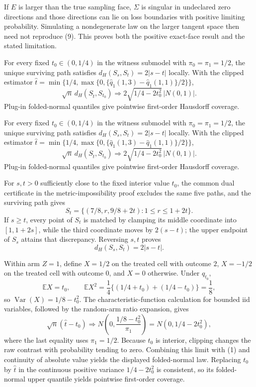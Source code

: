 If \(E\) is larger than the true sampling face, \(\Sigma\) is singular in undeclared zero directions and those directions can lie on loss boundaries with positive limiting probability.  Simulating a nondegenerate law on the larger tangent space then need not reproduce (9).  This proves both the positive exact-face result and the stated limitation.

For every fixed \(t_0\in(0,1/4)\) in the witness submodel with \(\pi_0=\pi_1=1/2\), the unique surviving path satisfies \(d_H(S_s,S_t)=2|s-t|\) locally.  With the clipped estimator \(\widehat t=\min\{1/4,\max\{0,\{\widehat q_1(1,3)-\widehat q_1(1,1)\}/2\}\}\),
\[
\sqrt n\,d_H(S_{\widehat t},S_{t_0})\Rightarrow2\sqrt{1/4-2t_0^2}\,|N(0,1)|.
\]
Plug-in folded-normal quantiles give pointwise first-order Hausdorff coverage.

For every fixed \(t_0\in(0,1/4)\) in the witness submodel with \(\pi_0=\pi_1=1/2\), the unique surviving path satisfies \(d_H(S_s,S_t)=2|s-t|\) locally.  With the clipped estimator \(\widehat t=\min\{1/4,\max\{0,\{\widehat q_1(1,3)-\widehat q_1(1,1)\}/2\}\}\),
\[
\sqrt n\,d_H(S_{\widehat t},S_{t_0})\Rightarrow2\sqrt{1/4-2t_0^2}\,|N(0,1)|.
\]
Plug-in folded-normal quantiles give pointwise first-order Hausdorff coverage.

For \(s,t>0\) sufficiently close to the fixed interior value \(t_0\), the common dual certificate in the metric-impossibility proof excludes the same five paths, and the surviving path gives
\[
S_t=\{(7/8,r,9/8+2t):1\le r\le1+2t\}.
\]
If \(s\ge t\), every point of \(S_t\) is matched by clamping its middle coordinate into \([1,1+2s]\), while the third coordinate moves by \(2(s-t)\); the upper endpoint of \(S_s\) attains that discrepancy.  Reversing \(s,t\) proves
\[
d_H(S_s,S_t)=2|s-t|.
\tag{1}
\]

Within arm \(Z=1\), define \(X=1/2\) on the treated cell with outcome \(2\), \(X=-1/2\) on the treated cell with outcome \(0\), and \(X=0\) otherwise.  Under \(q_{t_0}\),
\[
\mathbb EX=t_0,\qquad
\mathbb EX^2=\frac14\{(1/4+t_0)+(1/4-t_0)\}=\frac18,
\]
so \(\operatorname{Var}(X)=1/8-t_0^2\).  The characteristic-function calculation for bounded iid variables, followed by the random-arm ratio expansion, gives
\[
\sqrt n(\widehat t-t_0)\Rightarrow
N\!\left(0,\frac{1/8-t_0^2}{\pi_1}\right)
=N(0,1/4-2t_0^2),
\]
where the last equality uses \(\pi_1=1/2\).  Because \(t_0\) is interior, clipping changes the raw contrast with probability tending to zero.  Combining this limit with (1) and continuity of absolute value yields the displayed folded-normal law.  Replacing \(t_0\) by \(\widehat t\) in the continuous positive variance \(1/4-2t_0^2\) is consistent, so its folded-normal upper quantile yields pointwise first-order coverage.
